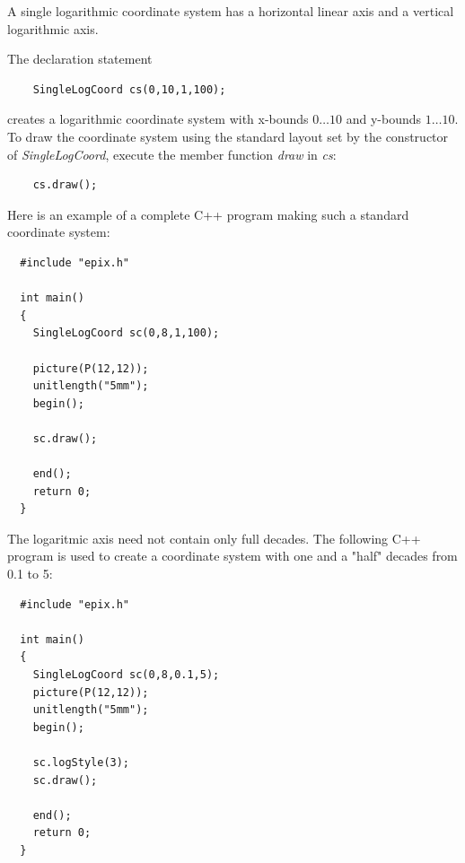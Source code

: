 \documentclass[12pt,a4paper]{article}
\begin{document}
  A single logarithmic coordinate system has a horizontal linear axis
  and a vertical logarithmic axis.

  The declaration statement

  \begin{lstlisting}
    SingleLogCoord cs(0,10,1,100);
  \end{lstlisting}

  creates a logarithmic coordinate system with x-bounds $0\ldots10$
  and y-bounds $1\ldots10$. To draw the coordinate system using the
  standard layout set by the constructor of \textit{SingleLogCoord},
  execute the member function \textit{draw} in \textit{cs}:

  \begin{lstlisting}
    cs.draw();
  \end{lstlisting}

  Here is an example of a complete C++ program making such a standard
  coordinate system:

  \begin{minipage}{7.5cm}
    \begin{lstlisting}
  #include "epix.h"

  int main()
  {
    SingleLogCoord sc(0,8,1,100);

    picture(P(12,12));
    unitlength("5mm");
    begin();

    sc.draw();

    end();
    return 0;
  }
    \end{lstlisting}
  \end{minipage}
  \begin{minipage}{5.5cm}
    
  \end{minipage}

  The logaritmic axis need not contain only full decades. The
  following C++ program is used to create a coordinate system with one
  and a "half" decades from 0.1 to 5:

  \begin{minipage}{7.5cm}
    \begin{lstlisting}
  #include "epix.h"

  int main()
  {
    SingleLogCoord sc(0,8,0.1,5);
    picture(P(12,12));
    unitlength("5mm");
    begin();

    sc.logStyle(3);
    sc.draw();

    end();
    return 0;
  }
    \end{lstlisting}
  \end{minipage}
  \begin{minipage}{5.5cm}
    
  \end{minipage}
\end{document}
